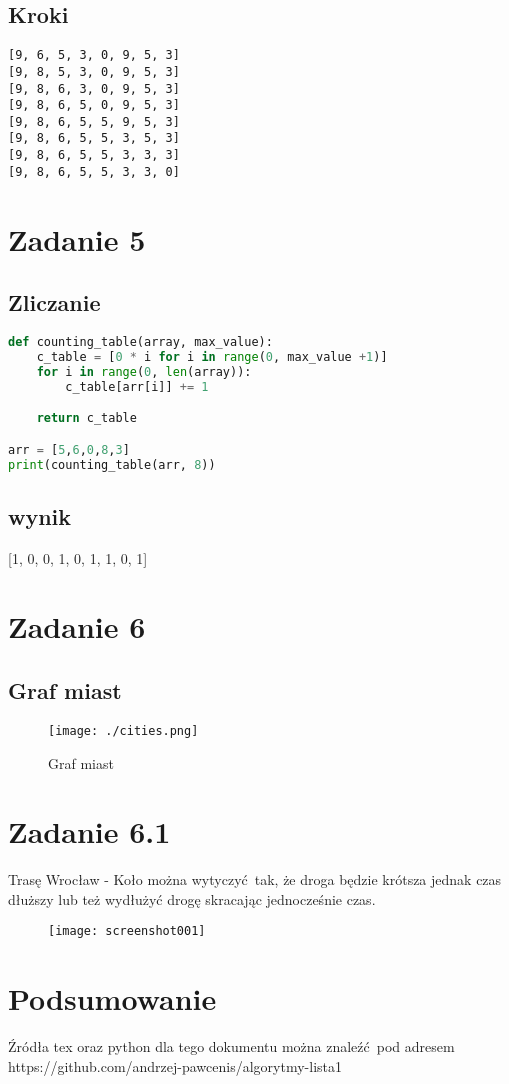 \documentclass{article}
\begin{document}
		\subsection{Kroki}
			\begin{lstlisting}
[9, 6, 5, 3, 0, 9, 5, 3]
[9, 8, 5, 3, 0, 9, 5, 3]
[9, 8, 6, 3, 0, 9, 5, 3]
[9, 8, 6, 5, 0, 9, 5, 3]
[9, 8, 6, 5, 5, 9, 5, 3]
[9, 8, 6, 5, 5, 3, 5, 3]
[9, 8, 6, 5, 5, 3, 3, 3]
[9, 8, 6, 5, 5, 3, 3, 0]
			\end{lstlisting}
	\section{Zadanie 5}
		\subsection{Zliczanie}
			\begin{lstlisting}[language=python, caption={implementacja tablicy zliczajacej}]
def counting_table(array, max_value):
	c_table = [0 * i for i in range(0, max_value +1)]
	for i in range(0, len(array)):
		c_table[arr[i]] += 1

	return c_table

arr = [5,6,0,8,3]
print(counting_table(arr, 8))
			\end{lstlisting}
		\subsection{wynik}
			[1, 0, 0, 1, 0, 1, 1, 0, 1]
	\section{Zadanie 6}
		\subsection{Graf miast}
			\begin{figure}[h]
				\centering
				\texttt{[image: ./cities.png]}
				\caption{Graf miast}
				\label{fig:obraz}
			\end{figure}
	
	\section{Zadanie 6.1}
		Trasę Wrocław - Koło można wytyczyć tak, że droga będzie krótsza jednak czas dłuższy lub też wydłużyć drogę skracając jednocześnie czas.
		\begin{figure}
			\centering
			\texttt{[image: screenshot001]}
			\caption{}
			\label{fig:screenshot001}
		\end{figure}
	\section{Podsumowanie}
		Źródła tex oraz python dla tego dokumentu można znaleźć pod adresem https://github.com/andrzej-pawcenis/algorytmy-lista1		
\end{document}
